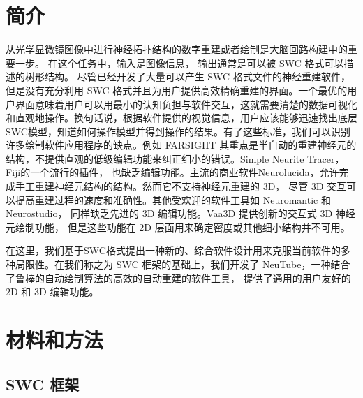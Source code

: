 {\section{简介}
从光学显微镜图像中进行神经拓扑结构的数字重建或者绘制是大脑回路构建中的重要一步。 在这个任务中，输入是图像信息， 输出通常是可以被 SWC 格式可以描述的树形结构。 尽管已经开发了大量可以产生 SWC 格式文件的神经重建软件，但是没有充分利用 SWC 格式并且为用户提供高效精确重建的界面。一个最优的用户界面意味着用户可以用最小的认知负担与软件交互，这就需要清楚的数据可视化和直观地操作。换句话说，根据软件提供的视觉信息，用户应该能够迅速找出底层SWC模型，知道如何操作模型并得到操作的结果。有了这些标准，我们可以识别许多绘制软件应用程序的缺点。例如 FARSIGHT 其重点是半自动的重建神经元的结构，不提供直观的低级编辑功能来纠正细小的错误。Simple Neurite Tracer，Fiji的一个流行的插件， 也缺乏编辑功能。主流的商业软件Neurolucida，允许完成手工重建神经元结构的结构。然而它不支持神经元重建的 3D， 尽管 3D 交互可以提高重建过程的速度和准确性。其他受欢迎的软件工具如 Neuromantic 和 Neurostudio， 同样缺乏先进的 3D 编辑功能。Vaa3D 提供创新的交互式 3D 神经元绘制功能， 但是这些功能在 2D 层面用来确定密度或其他细小结构并不可用。

在这里，我们基于SWC格式提出一种新的、综合软件设计用来克服当前软件的多种局限性。在我们称之为 SWC 框架的基础上，我们开发了 NeuTube，一种结合了鲁棒的自动绘制算法的高效的自动重建的软件工具， 提供了通用的用户友好的 2D 和 3D 编辑功能。

\section{材料和方法}

\subsection{SWC 框架}

}
